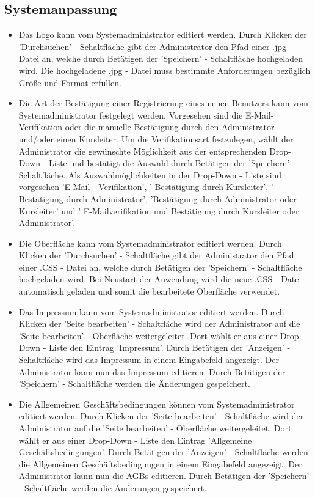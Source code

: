 \documentclass[a4paper]{scrreprt}
\begin{document}
		\subsection{Systemanpassung}
			\begin{itemize}
				\item {}
					Das Logo kann vom Systemadministrator editiert werden. Durch Klicken der 'Durchsuchen' - Schaltfläche gibt der Administrator den Pfad einer .jpg - Datei an, welche durch Betätigen der 'Speichern' - Schaltfläche hochgeladen wird. Die hochgeladene .jpg - Datei muss bestimmte Anforderungen bezüglich Größe und Format erfüllen.
				\item {}
					Die Art der Bestätigung einer Registrierung eines neuen Benutzers kann vom Systemadministrator festgelegt werden.
					Vorgesehen sind die E-Mail-Verifikation oder die manuelle Bestätigung durch den Administrator und/oder einen Kursleiter. Um die Verifikationsart festzulegen, wählt der Administrator die gewünschte Möglichkeit aus der entsprechenden Drop-Down - Liste und bestätigt die Auswahl durch Betätigen der 'Speichern'- Schaltfläche. Als Auswahlmöglichkeiten in der Drop-Down - Liste sind vorgesehen 'E-Mail - Verifikation', ' Bestätigung durch Kursleiter', ' Bestätigung durch Administrator', 'Bestätigung durch Administrator oder Kursleiter' und ' E-Mailverifikation und Bestätigung durch Kursleiter oder Administrator'.
				\item {}
					Die Oberfläche kann vom Systemadministrator editiert werden. Durch Klicken der 'Durchsuchen' - Schaltfläche gibt der Administrator den Pfad einer .CSS - Datei an, welche durch Betätigen der 'Speichern' - Schaltfläche hochgeladen wird. Bei Neustart der Anwendung wird die neue .CSS - Datei automatisch geladen und somit die bearbeitete Oberfläche verwendet.
				\item {}
					Das Impressum kann vom Systemadministrator editiert werden. Durch Klicken der 'Seite bearbeiten' - Schaltfläche wird der Administrator auf die 'Seite bearbeiten' - Oberfläche weitergeleitet. Dort wählt er aus einer Drop-Down - Liste den Eintrag 'Impressum'. Durch Betätigen der 'Anzeigen' - Schaltfläche wird das Impressum in einem Eingabefeld angezeigt. Der Administrator kann nun das Impressum editieren. Durch Betätigen der 'Speichern' - Schaltfläche werden die Änderungen gespeichert.  
				\item {}
				    Die Allgemeinen Geschäftsbedingungen können vom Systemadministrator editiert werden. Durch Klicken der 'Seite bearbeiten' - Schaltfläche wird der Administrator auf die 'Seite bearbeiten' - Oberfläche weitergeleitet. Dort wählt er aus einer Drop-Down - Liste den Eintrag 'Allgemeine Geschäftsbedingungen'. Durch Betätigen der 'Anzeigen' - Schaltfläche werden die Allgemeinen Geschäftsbedingungen in einem Eingabefeld angezeigt. Der Administrator kann nun die AGBs editieren. Durch Betätigen der 'Speichern' - Schaltfläche werden die Änderungen gespeichert.  

\end{itemize}
\end{document}
